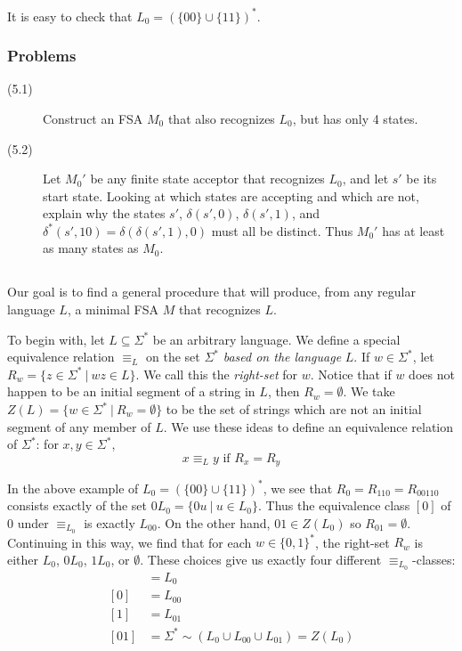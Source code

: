 \documentclass{article}
\begin{document}
It is easy to check that $L_0 = ( \{00\} \cup \{11\} )^*$. 


\subsubsection*{Problems}

\begin{description}
  \item[(5.1)] Construct an FSA $M_0$ that also recognizes $L_0$, but has only 4 states. 
  \item[(5.2)] Let $M_0'$ be any finite state acceptor that recognizes $L_0$, and let $s'$ be its start state. Looking at which states are accepting and which are not, explain why the states $s'$, $\delta(s',0)$, $\delta(s',1)$, and $\delta^*(s',10) = \delta(\delta(s',1),0)$ must all be distinct. Thus $M_0'$ has at least as many states as $M_0$.
\end{description}


\subsection*{ }

Our goal is to find a general procedure that will produce, from any regular language $L$, a minimal FSA $M$ that recognizes $L$.

To begin with, let $L \subseteq \Sigma^*$ be an arbitrary language. We define a special equivalence relation $\equiv_L$ on the set $\Sigma^*$ \emph{based on the language} $L$. If $w \in \Sigma^*$, let $R_w = \{ z \in \Sigma^*\ |\ wz \in L \}$. We call this the \emph{right-set} for $w$. Notice that if $w$ does not happen to be an initial segment of a string in $L$, then $R_w = \emptyset$. We take $Z(L) = \{ w \in \Sigma^*\ |\ R_w = \emptyset\}$ to be the set of strings which are not an initial segment of any member of $L$. We use these ideas to define an equivalence relation of $\Sigma^*$: for $x,y \in \Sigma^*$,
\begin{equation*}
x \equiv_L y \text{ if } R_x = R_y
\end{equation*}

In the above example of $L_0 = (\{00\}\cup\{11\})^*$, we see that $R_0 = R_{110} = R_{00110}$ consists exactly of the set $0L_0 = \{ 0u\ |\ u \in L_0 \}$. Thus the equivalence class $[0]$ of $0$ under $\equiv_{L_0}$ is exactly $L_00$. On the other hand, $01 \in Z(L_0)$ so $R_{01} = \emptyset$. Continuing in this way, we find that for each $w\in\{0,1\}^*$, the right-set $R_w$ is either $L_0$, $0L_0$, $1L_0$, or $\emptyset$. These choices give us exactly four different $\equiv_{L_0}$-classes:
\begin{align*}
[\lambda] & = L_0 \\
[0] & = L_00 \\
[1] & = L_01 \\
[01] & = \Sigma^* \sim(L_0 \cup L_00 \cup L_01) = Z(L_0)
\end{align*}
\end{document}
